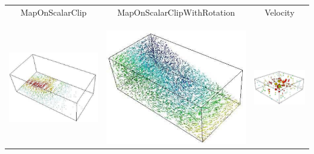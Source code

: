 \begin{table}[ht]
\begin{tabular}{c c c}
MapOnScalarClip & MapOnScalarClipWithRotation & Velocity \\ \\ \\ \\
\includegraphics[width=\thumbnailwidth]{figures/VelocityOnPlaneCut} & 
\includegraphics[width=\thumbnailwidth]{figures/VelocityOnPlaneClip} & 
\includegraphics[width=\thumbnailwidth]{figures/Ellipsoid} \\ 

\end{tabular}
\end{table}
